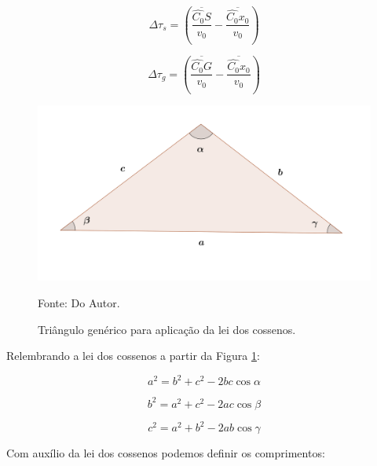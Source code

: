 \begin{equation}
\label{eq:ap:1.5}
\Delta \tau_s = \left( \frac{\overline{\hat{C_0}S}}{v_0} - \frac{\overline{\hat{C_0}x_0}}{v_0} \right)
\end{equation}

\begin{equation}
\label{eq:ap:1.6}
\Delta \tau_g = \left( \frac{\overline{\hat{C_0}G}}{v_0} - \frac{\overline{\hat{C_0}x_0}}{v_0} \right)
\end{equation}

\begin{figure}[H]
\caption{Triângulo genérico para aplicação da lei dos cossenos.}
\begin{center}
\includegraphics[scale=0.8]{images/leiCossenos.png}
\vspace{-0.3cm}
\end{center}
\begin{center}
 Fonte: Do Autor.
\end{center}
\label{fig:ap:1.2}
\end{figure}

Relembrando a lei dos cossenos a partir da Figura \ref{fig:ap:1.2}:

\begin{equation}
 \label{eq:ap:1.7}
 a^2 = b^2 + c^2 - 2 b c \cos{\alpha}
\end{equation}

\begin{equation}
 \label{eq:ap:1.8}
 b^2 = a^2 + c^2 - 2 a c \cos{\beta}
\end{equation}

\begin{equation}
 \label{eq:ap:1.9}
 c^2 = a^2 + b^2 - 2 a b \cos{\gamma}
\end{equation}

Com auxílio da lei dos cossenos podemos definir os comprimentos:

